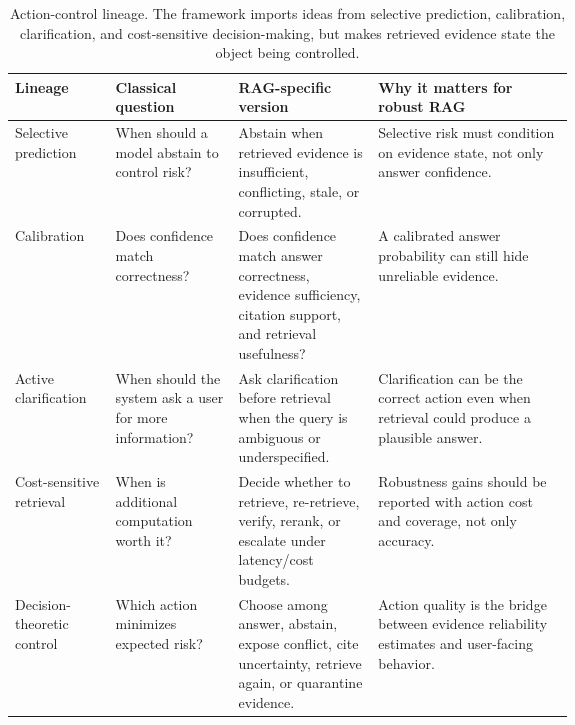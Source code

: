 \documentclass[11pt]{article}
\begin{document}

\begin{table}[t]
\centering
\scriptsize
\renewcommand{\arraystretch}{0.9}
\begin{tabularx}{\linewidth}{>{\raggedright\arraybackslash}p{0.18\linewidth}>{\raggedright\arraybackslash}p{0.22\linewidth}>{\raggedright\arraybackslash}p{0.25\linewidth}X}
\toprule
\textbf{Lineage} & \textbf{Classical question} & \textbf{RAG-specific version} & \textbf{Why it matters for robust RAG} \\
\midrule
Selective prediction & When should a model abstain to control risk? & Abstain when retrieved evidence is insufficient, conflicting, stale, or corrupted. & Selective risk must condition on evidence state, not only answer confidence. \\
Calibration & Does confidence match correctness? & Does confidence match answer correctness, evidence sufficiency, citation support, and retrieval usefulness? & A calibrated answer probability can still hide unreliable evidence. \\
Active clarification & When should the system ask a user for more information? & Ask clarification before retrieval when the query is ambiguous or underspecified. & Clarification can be the correct action even when retrieval could produce a plausible answer. \\
Cost-sensitive retrieval & When is additional computation worth it? & Decide whether to retrieve, re-retrieve, verify, rerank, or escalate under latency/cost budgets. & Robustness gains should be reported with action cost and coverage, not only accuracy. \\
Decision-theoretic control & Which action minimizes expected risk? & Choose among answer, abstain, expose conflict, cite uncertainty, retrieve again, or quarantine evidence. & Action quality is the bridge between evidence reliability estimates and user-facing behavior. \\
\bottomrule
\end{tabularx}
\caption{Action-control lineage. The framework imports ideas from selective prediction, calibration, clarification, and cost-sensitive decision-making, but makes retrieved evidence state the object being controlled.}
\label{tab:action-control-lineage}
\end{table}


\end{document}
